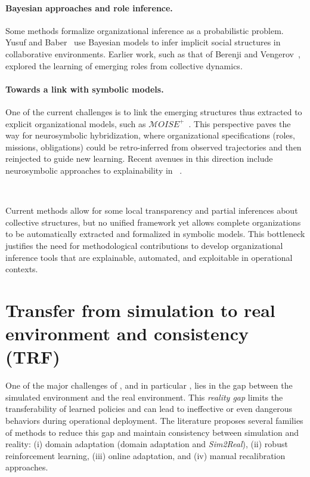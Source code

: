         \paragraph{Bayesian approaches and role inference.}
        Some methods formalize organizational inference
        as a probabilistic problem.
        Yusuf and Baber~\cite{yusuf2020inferential} use Bayesian models
        to infer implicit social structures in collaborative environments.
        Earlier work, such as that of Berenji and Vengerov~\cite{berenji2000learning},
        explored the learning of emerging roles from collective dynamics.

        \paragraph{Towards a link with symbolic models.}
        One of the current challenges is to link the emerging structures
        thus extracted to explicit organizational models,
        such as $\mathcal{M}OISE^+$~\cite{hubner2007using}.
        This perspective paves the way for neurosymbolic hybridization,
        where organizational specifications
        (roles, missions, obligations) could be retro-inferred from observed trajectories
        and then reinjected to guide new learning.
        Recent avenues in this direction include neurosymbolic approaches
        to explainability in ~\cite{subramanian2024neurosymbolic}.

        \

        Current methods allow for some local transparency
        and partial inferences about collective structures,
        but no unified framework yet allows
        complete organizations to be automatically extracted
        and formalized in symbolic models.
        This bottleneck justifies the need for methodological contributions
        to develop organizational inference tools
        that are explainable, automated, and exploitable in operational contexts.

        \section{Transfer from simulation to real environment and consistency (TRF)}

        \noindent
        One of the major challenges of , and in particular , lies in the gap
        between the simulated environment and the real environment. This \textit{reality gap}
        limits the transferability of learned policies and
        can lead to ineffective or even dangerous behaviors
        during operational deployment. The literature proposes several families of methods
        to reduce this gap and maintain consistency between simulation and reality:
        (i) domain adaptation (domain adaptation and \textit{Sim2Real}),
        (ii) robust reinforcement learning,
        (iii) online adaptation, and
        (iv) manual recalibration approaches.

